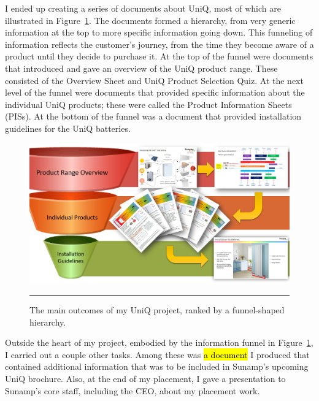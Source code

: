 I ended up creating a series of documents about UniQ, most of which are illustrated in Figure~\ref{funnel}.
The documents formed a hierarchy, from very generic information at the top to more specific information going down.
This funneling of information reflects the customer's journey, from the time they become aware of a product until they decide to purchase it.
At the top of the funnel were documents that introduced and gave an overview of the UniQ product range.
These consisted of the Overview Sheet and UniQ Product Selection Quiz.
At the next level of the funnel were documents that provided specific information about the individual UniQ products; these were called the Product Information Sheets (PISs).
At the bottom of the funnel was a document that provided installation guidelines for the UniQ batteries.


\begin{figure}[htbp]
	\centering
	\includegraphics[width=\textwidth]{figures/Funnel.PNG}
	\rule{\textwidth}{0.5pt} %
	\caption{The main outcomes of my UniQ project, ranked by a funnel-shaped hierarchy.}
	\label{funnel}
\end{figure}


Outside the heart of my project, embodied by the information funnel in Figure~\ref{funnel}, I carried out a couple other tasks.
Among these was \hl{a document} I produced that contained additional information that was to be included in Sunamp's upcoming UniQ brochure.
Also, at the end of my placement, I gave a presentation to Sunamp's core staff, including the CEO, about my placement work.

